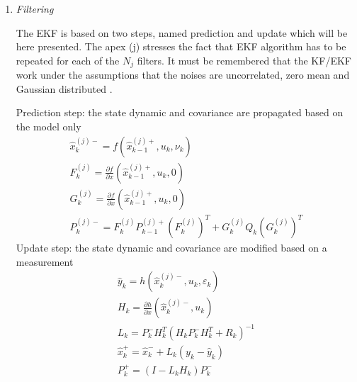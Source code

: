\begin{enumerate}
\item \textit{Filtering}

The EKF is based on two steps, named prediction and update which will be here presented. The apex (j) stresses the fact that EKF algorithm has to be repeated for each of the $N_j$ filters. It must be remembered that the KF/EKF work under the assumptions that the noises are uncorrelated, zero mean and Gaussian distributed \cite{Kalman_Filter_and_Its_Application}. 

Prediction step: the state dynamic and covariance are propagated based on the model only 
\begin{gather}
  \hat{x}_k^{(j)-} = f(\hat{x}_{k-1}^{(j)+}, u_k, \nu_k)\\
  F_k^{(j)} = \frac{\partial f}{\partial x}(\hat{x}_{k-1}^{(j)+}, u_k, 0)\\
  G_k^{(j)} = \frac{\partial f}{\partial x}(\hat{x}_{k-1}^{(j)+}, u_k, 0)\\
  P_k^{(j)-} = F_k^{(j)} P_{k-1}^{(j)+} \left(F_k^{(j)}\right)^T + G_k^{(j)} Q_k \left(G_k^{(j)}\right)^T
\end{gather}
Update step: the state dynamic and covariance are modified based on a measurement 
\begin{gather}
  \hat{y}_k = h(\hat{x}_k^{(j)-}, u_k, \varepsilon_k)\\
  H_k = \frac{\partial h}{\partial x}(\hat{x}_k^{(j)-}, u_k)\\
  L_k = P_k^- H_k^T (H_k P_k^- H_k^T + R_k)^{-1}\\
  \hat{x}_k^+ = \hat{x}_k^- + L_k (y_k - \hat{y}_k)\\
  P_k^+ = (I - L_k H_k) P_k^-
\end{gather}


\end{enumerate}
